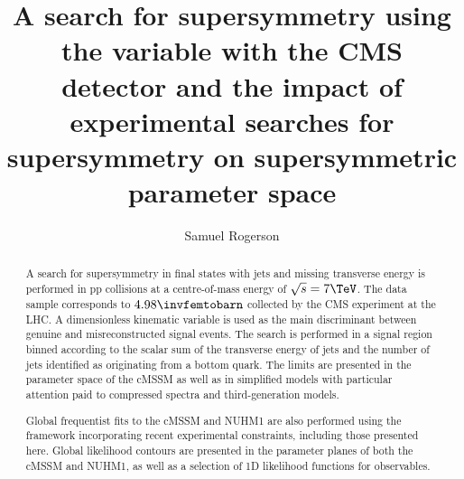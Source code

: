 \documentclass[]{mythesis}
\title{A search for supersymmetry using the \aT variable with the CMS detector
    and the impact of experimental searches for supersymmetry on supersymmetric
parameter space}
\author{Samuel Rogerson}
\begin{document}


\setcounter{page}{1}
  \maketitle
  \begin{abstract}

      A search for supersymmetry in final states with jets and missing
      transverse energy is performed in pp collisions at a centre-of-mass energy
      of $\sqrt{s}=7\TeV$. The data sample corresponds to $4.98\invfemtobarn$
      collected by the CMS experiment at the LHC.  A dimensionless kinematic
      variable is used as the main discriminant between genuine and
      misreconstructed signal events. The search is performed in a signal region
      binned according to the scalar sum of the transverse energy of jets and
      the number of jets identified as originating from a bottom quark.  The
      limits are presented in the parameter space of the \ac{cMSSM} as well as
      in simplified models with particular attention paid to compressed spectra
      and third-generation models.

      Global frequentist fits to the \ac{cMSSM} and NUHM1 are also performed
      using the \Mastercode framework incorporating recent experimental
      constraints, including those presented here.  Global likelihood contours
      are presented in the parameter planes of both the \ac{cMSSM} and NUHM1, as
      well as a selection of 1D likelihood functions for observables.
  
  \end{abstract}
  
  \tableofcontents \listoffigures

\newpage
{}
\setcounter{page}{1}
  
  
  
  
  
  
  

%
  
  
\end{document}
